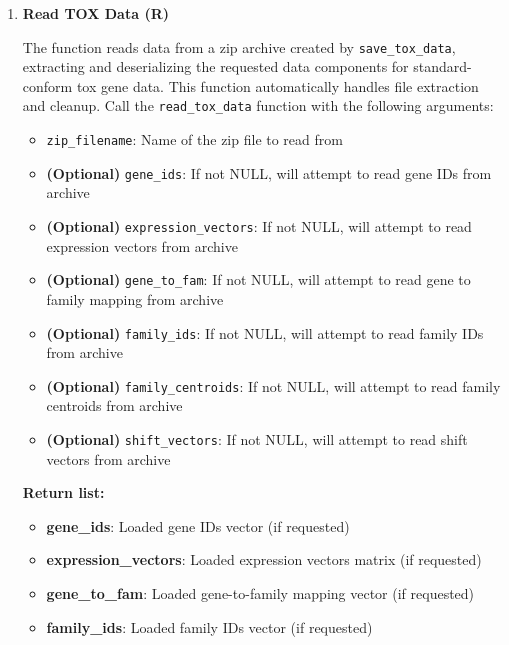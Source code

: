 \documentclass[11pt]{article}
\begin{document}
\begin{enumerate}
\item \textbf{Read TOX Data (R)}

The function reads data from a zip archive created by \texttt{save\_tox\_data},
extracting and deserializing the requested data components for standard-conform
tox gene data. This function automatically handles file extraction and
cleanup. Call the \texttt{read\_tox\_data} function with the following
arguments:

\begin{itemize}
	\item \texttt{zip\_filename}: Name of the zip file to read from
	      
	\item \textbf{(Optional)} \texttt{gene\_ids}: If not NULL, will attempt to
	      read gene IDs from archive
	      
	\item \textbf{(Optional)} \texttt{expression\_vectors}: If not NULL, will
	      attempt to read expression vectors from archive
	      
	\item \textbf{(Optional)} \texttt{gene\_to\_fam}: If not NULL, will attempt
	      to read gene to family mapping from archive
	      
	\item \textbf{(Optional)} \texttt{family\_ids}: If not NULL, will attempt
	      to read family IDs from archive
	      
	\item \textbf{(Optional)} \texttt{family\_centroids}: If not NULL, will attempt
	      to read family centroids from archive
	      
	\item \textbf{(Optional)} \texttt{shift\_vectors}: If not NULL, will attempt
	      to read shift vectors from archive
\end{itemize}

\textbf{Return list:}
\begin{itemize}
	\item \textbf{gene\_ids}: Loaded gene IDs vector (if requested)
	      
	\item \textbf{expression\_vectors}: Loaded expression vectors matrix (if
	      requested)
	      
	\item \textbf{gene\_to\_fam}: Loaded gene-to-family mapping vector (if
	      requested)
	      
	\item \textbf{family\_ids}: Loaded family IDs vector (if requested)
	      

\end{itemize}
\end{enumerate}
\end{document}
